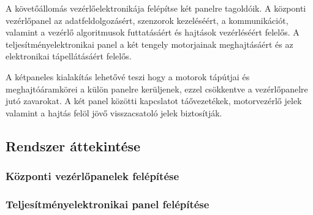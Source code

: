 A követőállomás vezérlőelektronikája 
felépítse két panelre tagoldóik. A központi vezérlőpanel az 
adatfeldolgozásért, szenzorok kezeléséért, a kommunikációt, valamint a vezérlő algoritmusok
futtatásáért és hajtások vezérléséért felelős.
A teljesítményelektronikai panel a két tengely 
motorjainak meghajtásáért és az elektronikai tápellátásáért felelős.

A kétpaneles kialakítás lehetővé teszi hogy a motorok
tápútjai és  meghajtóáramkörei a külön panelre kerüljenek,
ezzel csökkentve a vezérlőpanelre jutó zavarokat.
A két panel közötti kapcslatot táővezetékek, 
motorvezérlő jelek valamint a hajtás felöl jövő visszacsatoló jelek biztosítják.

\subsection{Rendszer áttekintése}


\subsubsection{Központi vezérlőpanelek felépítése}


\subsubsection{Teljesítményelektronikai panel felépítése}


